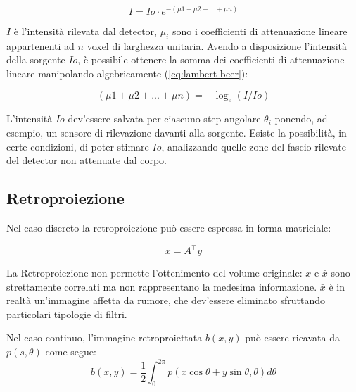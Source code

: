 \documentclass[a4paper,12pt, doubleside]{report}
\begin{document}
                    \begin{equation} \label{eq:lambert-beer}
                        I = Io \cdot e^{- (\mu1 + \mu2 + ...  + \mu n)}
                    \end{equation}
                    
                    $I$ è l'intensità rilevata dal detector, $\mu_i$ sono i coefficienti di attenuazione lineare appartenenti ad $n$ voxel di larghezza unitaria. Avendo a disposizione l'intensità della sorgente $Io$, è possibile ottenere la somma dei coefficienti di attenuazione lineare manipolando algebricamente (\ref{eq:lambert-beer}):
                        
                    \begin{equation} \label{eq:normalization}
                        (\mu1 + \mu2 + ... + \mu n) = - \log_e{(I/Io)}
                    \end{equation}
                    
                    L'intensità $Io$ dev'essere salvata per ciascuno step angolare $\theta_i$ ponendo, ad esempio, un sensore di rilevazione davanti alla sorgente. Esiste la possibilità, in certe condizioni, di poter stimare $Io$, analizzando quelle zone del fascio rilevate del detector non attenuate dal corpo.
            
            \subsection{Retroproiezione}
                \par
                    Nel caso discreto la retroproiezione può essere espressa in forma matriciale:
                    
                    \begin{equation}
                        \bar{x} = A^\top y
                    \end{equation}
                    
                    La Retroproiezione non permette l'ottenimento del volume originale: $x$ e $\bar{x}$ sono strettamente correlati ma non rappresentano la medesima informazione. $\bar{x}$ è in realtà un'immagine affetta da rumore, che dev'essere eliminato sfruttando particolari tipologie di filtri.
                
                \bigskip
                \par
                    Nel caso continuo, l'immagine retroproiettata $b(x,y)$ può essere ricavata da $p(s,\theta)$ come segue:
                    \begin{equation}
                        b(x,y) = \frac{1}{2} \int_{0}^{2\pi} p(x \cos \theta + y \sin \theta , \theta ) d\theta
                    \end{equation}
                
\end{document}
